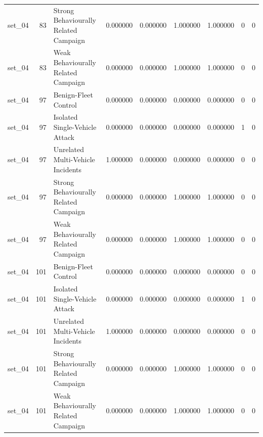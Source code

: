 \begin{tabular}{lrlrrrrrr}
set_04 & 83 & Strong Behaviourally Related Campaign & 0.000000 & 0.000000 & 1.000000 & 1.000000 & 0 & 0 \\
set_04 & 83 & Weak Behaviourally Related Campaign & 0.000000 & 0.000000 & 1.000000 & 1.000000 & 0 & 0 \\
set_04 & 97 & Benign-Fleet Control & 0.000000 & 0.000000 & 0.000000 & 0.000000 & 0 & 0 \\
set_04 & 97 & Isolated Single-Vehicle Attack & 0.000000 & 0.000000 & 0.000000 & 0.000000 & 1 & 0 \\
set_04 & 97 & Unrelated Multi-Vehicle Incidents & 1.000000 & 0.000000 & 0.000000 & 0.000000 & 0 & 0 \\
set_04 & 97 & Strong Behaviourally Related Campaign & 0.000000 & 0.000000 & 1.000000 & 1.000000 & 0 & 0 \\
set_04 & 97 & Weak Behaviourally Related Campaign & 0.000000 & 0.000000 & 1.000000 & 1.000000 & 0 & 0 \\
set_04 & 101 & Benign-Fleet Control & 0.000000 & 0.000000 & 0.000000 & 0.000000 & 0 & 0 \\
set_04 & 101 & Isolated Single-Vehicle Attack & 0.000000 & 0.000000 & 0.000000 & 0.000000 & 1 & 0 \\
set_04 & 101 & Unrelated Multi-Vehicle Incidents & 1.000000 & 0.000000 & 0.000000 & 0.000000 & 0 & 0 \\
set_04 & 101 & Strong Behaviourally Related Campaign & 0.000000 & 0.000000 & 1.000000 & 1.000000 & 0 & 0 \\
set_04 & 101 & Weak Behaviourally Related Campaign & 0.000000 & 0.000000 & 1.000000 & 1.000000 & 0 & 0 \\
\bottomrule
\end{tabular}

